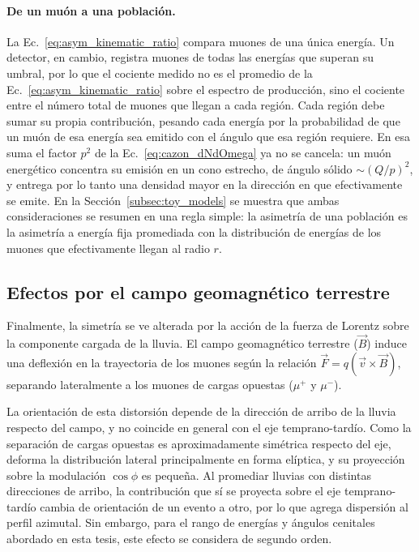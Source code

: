 \paragraph{De un muón a una población.} La Ec.~\ref{eq:asym_kinematic_ratio} compara muones de una única energía. Un detector, en cambio, registra muones de todas las energías que superan su umbral, por lo que el cociente medido no es el promedio de la Ec.~\ref{eq:asym_kinematic_ratio} sobre el espectro de producción, sino el cociente entre el número total de muones que llegan a cada región. Cada región debe sumar su propia contribución, pesando cada energía por la probabilidad de que un muón de esa energía sea emitido con el ángulo que esa región requiere. En esa suma el factor $p^2$ de la Ec.~\ref{eq:cazon_dNdOmega} ya no se cancela: un muón energético concentra su emisión en un cono estrecho, de ángulo sólido $\sim(Q/p)^2$, y entrega por lo tanto una densidad mayor en la dirección en que efectivamente se emite. En la Sección~\ref{subsec:toy_models} se muestra que ambas consideraciones se resumen en una regla simple: la asimetría de una población es la asimetría a energía fija promediada con la distribución de energías de los muones que efectivamente llegan al radio $r$.

\subsection{Efectos por el campo geomagnético terrestre}
\label{subsubsec:geomagnetico}

Finalmente, la simetría se ve alterada por la acción de la fuerza de Lorentz sobre la componente cargada de la lluvia. El campo geomagnético terrestre ($\vec{B}$) induce una deflexión en la trayectoria de los muones según la relación $\vec{F} = q(\vec{v} \times \vec{B})$, separando lateralmente a los muones de cargas opuestas ($\mu^+$ y $\mu^-$).

La orientación de esta distorsión depende de la dirección de arribo de la lluvia respecto del campo, y no coincide en general con el eje temprano-tardío. Como la separación de cargas opuestas es aproximadamente simétrica respecto del eje, deforma la distribución lateral principalmente en forma elíptica, y su proyección sobre la modulación $\cos\phi$ es pequeña. Al promediar lluvias con distintas direcciones de arribo, la contribución que sí se proyecta sobre el eje temprano-tardío cambia de orientación de un evento a otro, por lo que agrega dispersión al perfil azimutal. Sin embargo, para el rango de energías y ángulos cenitales abordado en esta tesis, este efecto se considera de segundo orden.

